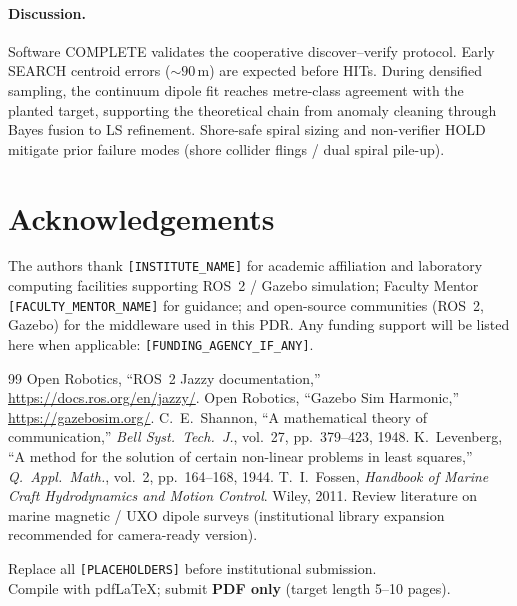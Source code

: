 \documentclass[11pt,a4paper]{article}
\begin{document}
\paragraph{Discussion.} Software COMPLETE validates the cooperative
discover--verify protocol. Early SEARCH centroid errors ($\sim90\,\mathrm{m}$)
are expected before HITs. During densified sampling, the continuum dipole fit
reaches metre-class agreement with the planted target, supporting the
theoretical chain from anomaly cleaning through Bayes fusion to LS refinement.
Shore-safe spiral sizing and non-verifier HOLD mitigate prior failure modes
(shore collider flings / dual spiral pile-up).

\section{Acknowledgements}
The authors thank \texttt{[INSTITUTE\_NAME]} for academic affiliation and
laboratory computing facilities supporting ROS~2 / Gazebo simulation; Faculty
Mentor \texttt{[FACULTY\_MENTOR\_NAME]} for guidance; and open-source
communities (ROS~2, Gazebo) for the middleware used in this PDR. Any funding
support will be listed here when applicable: \texttt{[FUNDING\_AGENCY\_IF\_ANY]}.

\begin{thebibliography}{99}
 Open Robotics, ``ROS~2 Jazzy documentation,''
\url{https://docs.ros.org/en/jazzy/}.
 Open Robotics, ``Gazebo Sim Harmonic,''
\url{https://gazebosim.org/}.
 C.~E.~Shannon, ``A mathematical theory of communication,''
\emph{Bell Syst.\ Tech.\ J.}, vol.~27, pp.~379--423, 1948.
 K.~Levenberg, ``A method for the solution of certain non-linear
problems in least squares,'' \emph{Q.\ Appl.\ Math.}, vol.~2, pp.~164--168, 1944.
 T.~I.~Fossen, \emph{Handbook of Marine Craft Hydrodynamics and
Motion Control}. Wiley, 2011.
 Review literature on marine magnetic / UXO dipole surveys
(institutional library expansion recommended for camera-ready version).
\end{thebibliography}

\vspace{0.8cm}
\begin{center}
\footnotesize
Replace all \texttt{[PLACEHOLDERS]} before institutional submission.\\
Compile with pdfLaTeX; submit \textbf{PDF only} (target length 5--10 pages).
\end{center}
\end{document}
